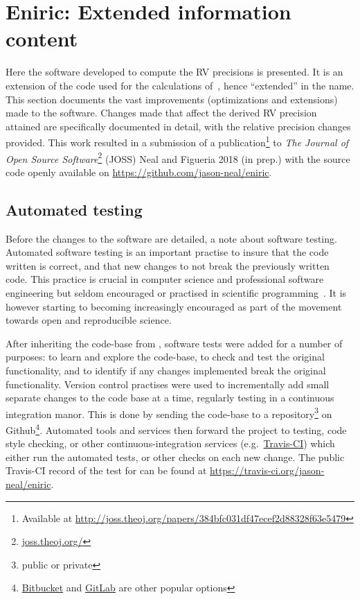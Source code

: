 
\section{Eniric: Extended \nir information content}
\label{sec:eniric}
Here the software developed to compute the {RV} precisions is presented.
It is an extension of the code used for the calculations of~\citet{figueira_radial_2016}, hence ``extended'' in the name.
This section documents the vast improvements (optimizations and extensions) made to the software.
Changes made that affect the derived {RV} precision attained are specifically documented in detail, with the relative precision changes provided.
This work resulted in a submission of a publication\footnote{Available at \href{http://joss.theoj.org/papers/384bfc031df47ecef2d88328f63e5479}{http://joss.theoj.org/papers/384bfc031df47ecef2d88328f63e5479}} to \emph{The Journal of Open Source Software}\footnote{\href{http://joss.theoj.org/}{joss.theoj.org/}} (JOSS) {Neal and Figueria 2018 (in prep.)} with the source code openly available on \href{Github}{https://github.com/jason-neal/eniric}.


\subsection{Automated testing}
\label{subsec:automated_testing}
Before the changes to the software are detailed, a note about software testing.
Automated software testing is an important practise to insure that the code written is correct, and that new changes to not break the previously written code.
This practice is crucial in computer science and professional software engineering but seldom encouraged or practised in scientific programming~\cite{storer_bridging_2017}.
It is however starting to becoming increasingly encouraged as part of the movement towards open and reproducible science.

After inheriting the code-base from \citet{figueira_radial_2016}, software tests were added for a number of purposes: to learn and explore the code-base, to check and test the original functionality, and to identify if any changes implemented break the original functionality.
Version control practises were used to incrementally add small separate changes to the code base at a time, regularly testing in a continuous integration manor.
This is done by sending the code-base to a repository\footnote{public or private} on Github\footnote{\href{https://bitbucket.org}{Bitbucket} and \href{https://gitlab.com}{GitLab} are other popular options}.
Automated tools and services then forward the project to testing, code style checking, or other continuous-integration services (e.g.\ \href{https://travis-ci.com}{Travis-CI}) which either run the automated tests, or other checks on each new change.
The public Travis-CI record of the test for \eniric{} can be found at \href{https://travis-ci.org/jason-neal/eniric}{https://travis-ci.org/jason-neal/eniric}.

